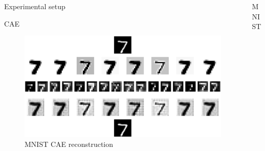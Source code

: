 \documentclass[final]{beamer}
\newlength{\sepwid}
\newlength{\onecolwid}
\newlength{\threecolwid}
\begin{document}
\begin{frame}[t]
\begin{columns}[t]
\begin{column}{\onecolwid}
\begin{block}{Experimental setup}
\end{block}


\begin{block}{CAE}
\begin{figure}
\includegraphics[width=0.8\linewidth]{graphics/feature_map_walkthrough_mnist.png}
\caption{MNIST CAE reconstruction}
\end{figure}
\end{block}


\end{column} %




\begin{column}{\threecolwid}

\begin{column}{\sepwid}\end{column} %


\begin{columns}[t, totalwidth=\threecolwid] %


\begin{column}{\onecolwid} %
\begin{block}{MNIST}




\end{block}
\end{column}
\end{columns}
\end{column}
\end{columns}
\end{frame}
\end{document}
